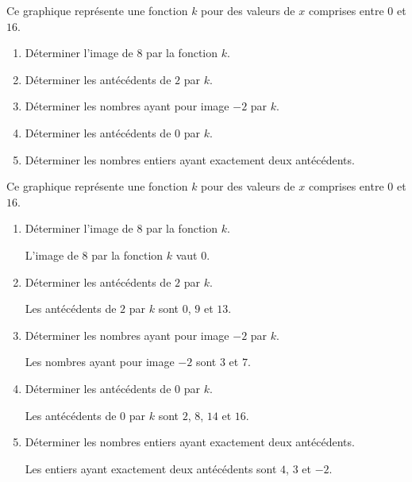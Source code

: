 \begin{exercice}
    Ce graphique représente une fonction $k$ pour des valeurs de $x$ comprises entre $0$ et $16$.
    
    \begin{enumerate}
        \item Déterminer l'image de $8$ par la fonction $k$.
        \item Déterminer les antécédents de $2$ par $k$.
        \item Déterminer les nombres ayant pour image $-2$ par $k$.
        \item Déterminer les antécédents de $0$ par $k$.
        \item Déterminer les nombres entiers ayant exactement deux antécédents.
    \end{enumerate}
\end{exercice}
\begin{corrige}
    Ce graphique représente une fonction $k$ pour des valeurs de $x$ comprises entre $0$ et $16$.
    
    \begin{enumerate}
        \item Déterminer l'image de $8$ par la fonction $k$.
        
        {\red L'image de $8$ par la fonction $k$ vaut $0$.}
    \end{enumerate}
    \Coupe
    \begin{enumerate}
        \setcounter{enumi}{1}
        \item Déterminer les antécédents de $2$ par $k$.
        
        {\red Les antécédents de $2$ par $k$ sont $0$, $9$ et $13$.}
        \item Déterminer les nombres ayant pour image $-2$ par $k$.
        
        {\red Les nombres ayant pour image $-2$ sont $3$ et $7$.}
        \item Déterminer les antécédents de $0$ par $k$.
        
        {\red Les antécédents de $0$ par $k$ sont $2$, $8$, $14$ et $16$.}
        \item Déterminer les nombres entiers ayant exactement deux antécédents.
        
        {\red Les entiers ayant exactement deux antécédents sont $4$, $3$ et $-2$.}
    \end{enumerate}
\end{corrige}
